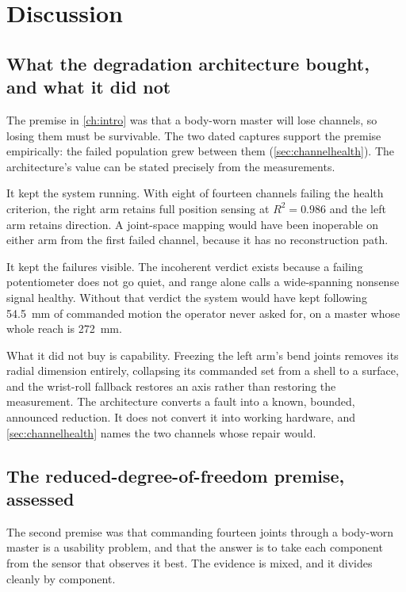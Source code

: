 \chapter{Discussion}
\label{ch:discussion}

\section{What the degradation architecture bought, and what it did not}

The premise in \cref{ch:intro} was that a body-worn master will lose channels,
so losing them must be survivable. The two dated captures support the premise
empirically: the failed population grew between them
(\cref{sec:channelhealth}). The architecture's value can be stated precisely
from the measurements.

It kept the system running. With eight of fourteen channels failing the health
criterion, the right arm retains full position sensing at $R^2 = \num{0.986}$
and the left arm retains direction. A joint-space mapping would have been
inoperable on either arm from the first failed channel, because it has no
reconstruction path.

It kept the failures visible. The incoherent verdict exists because a failing
potentiometer does not go quiet, and range alone calls a wide-spanning
nonsense signal healthy. Without that verdict the system would have kept
following \SI{54.5}{\milli\metre} of commanded motion the operator never
asked for, on a master whose whole reach is \SI{272}{\milli\metre}.

What it did not buy is capability. Freezing the left arm's bend joints removes
its radial dimension entirely, collapsing its commanded set from a shell to a
surface, and the wrist-roll fallback restores an axis rather than restoring
the measurement. The architecture converts a fault into a known, bounded,
announced reduction. It does not convert it into working hardware, and
\cref{sec:channelhealth} names the two channels whose repair would.

\section{The reduced-degree-of-freedom premise, assessed}

The second premise was that commanding fourteen joints through a body-worn
master is a usability problem, and that the answer is to take each component
from the sensor that observes it best. The evidence is mixed, and it divides
cleanly by component.

